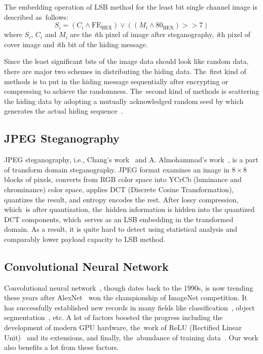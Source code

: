 \documentclass[futureinternet,article,accept,moreauthors,pdftex,10pt,a4paper]{Definitions/mdpi}
\begin{document}
The embedding operation of LSB method for the least bit single channel image is described as~follows:
\begin{equation*}
S_{i} = (C_{i} \land \mathrm{FE_{HEX}}) \lor ((M_{i} \land \mathrm{80_{HEX}}) >> 7)
\end{equation*}
where \(S_{i}\), \(C_{i}\) and \(M_{i}\) are the \emph{i}th pixel of image after steganography, \emph{i}th pixel of cover image and \emph{i}th bit of the hiding message.

Since the least significant bits of the image data should look like random data, there are major two schemes in distributing the hiding data. The~first kind of methods is to put in the hiding message sequentially after encrypting or compressing to achieve the randomness. The~second kind of methods is scattering the hiding data by adopting a mutually acknowledged random seed by which generates the actual hiding sequence~\cite{RobustImageSteg}.

\subsection{JPEG Steganography}%
\label{ssec:hcjpeg}

JPEG steganography, i.e., Chang's work~\cite{JPEGSteg} and A. Almohammad's work~\cite{HCJPEG}, is a part of transform domain steganography. JPEG format examines an image in \(8 \times 8\) blocks of pixels, converts from RGB color space into YCrCb (luminance and chrominance) color space, applies DCT (Discrete Cosine Transformation), quantizes the result, and entropy encodes the rest. After lossy compression, which~is after quantization, the~hidden information is hidden into the quantized DCT components, which~serves as an LSB embedding in the transformed domain. As a result, it is quite hard to detect using statistical analysis and comparably lower payload capacity to LSB method.

\subsection{Convolutional Neural Network}%
\label{ssec:convnet}

Convolutional neural network~\cite{conv}, though dates back to the 1990s, is now trending these years after AlexNet~\cite{alexnet} won the championship of ImageNet competition. It has successfully established new records in many fields like classification~\cite{imagenet2017}, object segmentation~\cite{coco2016}, etc. A lot of factors boosted the progress including the development of modern GPU hardware, the~work of ReLU (Rectified Linear Unit)~\cite{relu} and its extensions, and finally, the~abundance of training data~\cite{imagenet}. Our work also benefits a lot from these factors.
\end{document}
